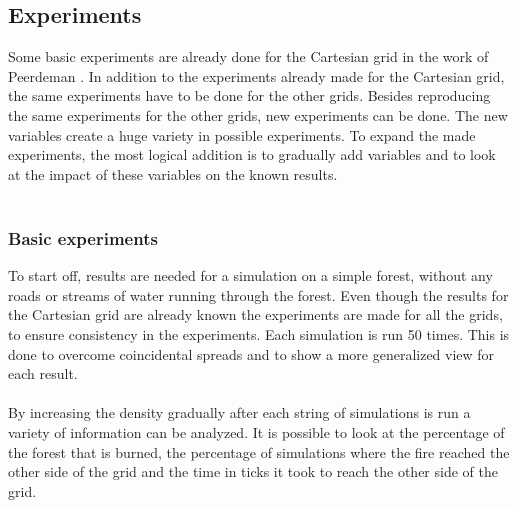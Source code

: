 \documentclass{article}
\begin{document}
\begin{multicols}{2}
\subsection*{Experiments}
Some basic experiments are already done for the Cartesian grid in the work of Peerdeman \cite{oldcode}. In addition to the experiments already made for the Cartesian grid, the same experiments have to be done for the other grids. Besides reproducing the same experiments for the other grids, new experiments can be done. The new variables create a huge variety in possible experiments. To expand the made experiments, the most logical addition is to gradually add variables and to look at the impact of these variables on the known results.\\\\

\subsubsection*{Basic experiments}
To start off, results are needed for a simulation on a simple forest, without any roads or streams of water running through the forest. Even though the results for the Cartesian grid are already known the experiments are made for all the grids, to ensure consistency in the experiments. Each simulation is run 50 times. This is done to overcome coincidental spreads and to show a more generalized view for each result.\\\\
By increasing the density gradually after each string of simulations is run a variety of information can be analyzed. It is possible to look at the percentage of the forest that is burned, the percentage of simulations where the fire reached the other side of the grid and the time in ticks it took to reach the other side of the grid.


\end{multicols}
\end{document}
